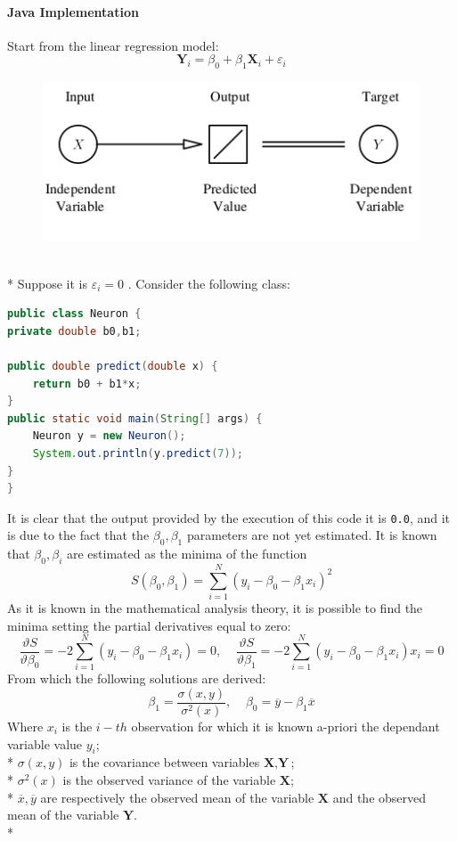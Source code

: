 \documentclass[10pt,a4paper]{article}
\begin{document}
	\paragraph{Java Implementation}
	Start from the linear regression model:
	$$
	\textbf{Y}_i = \beta_0 + \beta_1 \textbf{X}_i + \varepsilon_i
	$$
	\begin{figure}[h!]
		\centering
		\includegraphics[scale=2]{img/linreg}
	\end{figure}\\*
	Suppose it is $\varepsilon_i = 0$ . Consider the following class:
	\begin{lstlisting}[language=Java]
public class Neuron {
private double b0,b1;
	
public double predict(double x) {
	return b0 + b1*x;
}
public static void main(String[] args) {
	Neuron y = new Neuron();
	System.out.println(y.predict(7));
}
}
	\end{lstlisting}
	It is clear that the output provided by the execution of this code it is \texttt{0.0}, and it is due to the fact that the $\beta_0,\beta_1$ parameters are not yet estimated. It is known that $\beta_0,\beta_i$ are estimated as the minima of the function
	$$
	S(\beta_0,\beta_1) = \sum_{i=1}^N (y_i - \beta_0 - \beta_1 x_i)^2
	$$
	As it is known in the mathematical analysis theory, it is possible to find the minima setting the partial derivatives equal to zero:
	$$
	\frac{\vartheta S}{\vartheta \beta_0} = -2 \sum_{i=1}^N (y_i - \beta_0 - \beta_1x_i) = 0,\;\;\;\;
	\frac{\vartheta S}{\vartheta \beta_1} = -2 \sum_{i=1}^N (y_i - \beta_0 - \beta_1 x_i) x_i = 0
	$$
	From which the following solutions are derived:
	$$
	\beta_1 = \frac{\sigma(x,y)}{\sigma^2(x)},\;\;\;\;
	\beta_0 = \overline y - \beta_1 \overline x
	$$
	Where $ x_i$ is the $i-th$ observation for which it is known a-priori the dependant variable value $y_i$;\\* $\sigma(x,y)$ is the covariance between variables $\textbf{X},\textbf{Y}$;\\* $\sigma^2(x)$ is the observed variance of the variable $\textbf{X}$;\\* $\overline x, \overline y$ are respectively the observed mean of the variable $\textbf{X}$ and the observed mean of the variable $\textbf{Y}$.\\*
\end{document}
